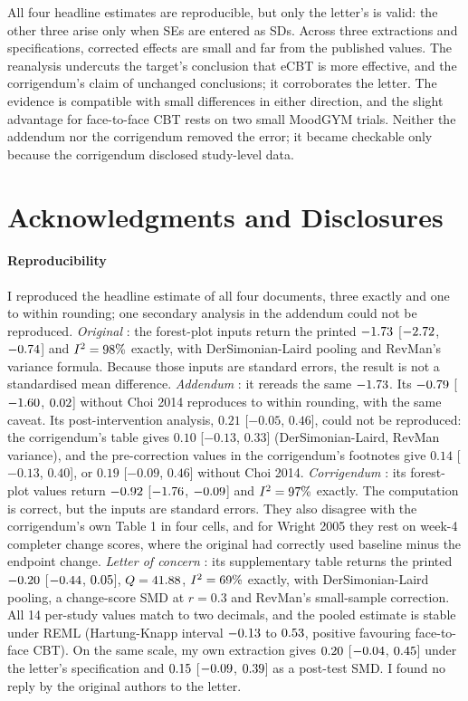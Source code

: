 \documentclass{JRR}
\begin{document}
All four headline estimates are reproducible, but only the letter's is valid: the other three arise only when SEs are entered as SDs. Across three extractions and \nSpecs{} specifications, corrected effects are small and far from the published values. The reanalysis undercuts the target's conclusion that eCBT is more effective, and the corrigendum's claim of unchanged conclusions; it corroborates the letter. The evidence is compatible with small differences in either direction, and the slight advantage for face-to-face CBT rests on two small MoodGYM trials. Neither the addendum nor the corrigendum removed the error; it became checkable only because the corrigendum disclosed study-level data.

\section*{\large{Acknowledgments and Disclosures}}
\label{sec:code}

\paragraph{Reproducibility}
I reproduced the headline estimate of all four documents, three exactly and one to within rounding; one secondary analysis in the addendum could not be reproduced. \emph{Original} \cite{luo2020}: the forest-plot inputs return the printed $-1.73$ [$-2.72$, $-0.74$] and $I^2 = 98\%$ exactly, with DerSimonian-Laird pooling and RevMan's variance formula. Because those inputs are standard errors, the result is not a standardised mean difference. \emph{Addendum} \cite{luo2020addendum}: it rereads the same $-1.73$. Its $-0.79$ [$-1.60$, $0.02$] without Choi 2014 reproduces to within rounding, with the same caveat. Its post-intervention analysis, $0.21$ [$-0.05$, $0.46$], could not be reproduced: the corrigendum's table gives $0.10$ [$-0.13$, $0.33$] (DerSimonian-Laird, RevMan variance), and the pre-correction values in the corrigendum's footnotes give $0.14$ [$-0.13$, $0.40$], or $0.19$ [$-0.09$, $0.46$] without Choi 2014. \emph{Corrigendum} \cite{sanger2021corrigendum}: its forest-plot values return $-0.92$ [$-1.76$, $-0.09$] and $I^2 = 97\%$ exactly. The computation is correct, but the inputs are standard errors. They also disagree with the corrigendum's own Table 1 in four cells, and for Wright 2005 they rest on week-4 completer change scores, where the original had correctly used baseline minus the endpoint change. \emph{Letter of concern} \cite{kriston2022concerns}: its supplementary table returns the printed $-0.20$ [$-0.44$, $0.05$], $Q = 41.88$, $I^2 = 69\%$ exactly, with DerSimonian-Laird pooling, a change-score SMD at $r = 0.3$ and RevMan's small-sample correction. All 14 per-study values match to two decimals, and the pooled estimate is stable under REML (Hartung-Knapp interval $-0.13$ to $0.53$, positive favouring face-to-face CBT). On the same scale, my own extraction gives $0.20$ [$-0.04$, $0.45$] under the letter's specification and $0.15$ [$-0.09$, $0.39$] as a post-test SMD. I found no reply by the original authors to the letter.
\end{document}
